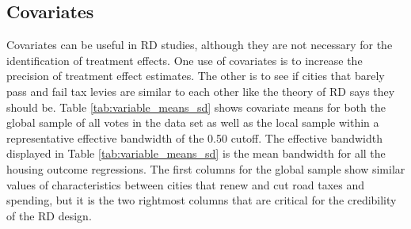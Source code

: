 

\subsection{Covariates} 

Covariates can be useful in RD studies, although they are not necessary for the identification of treatment effects.  One use of covariates is to increase the precision of treatment effect estimates.  The other is to see if cities that barely pass and fail tax levies are similar to each other like the theory of RD says they should be. Table \ref{tab:variable_means_sd} shows covariate means for both the global sample of all votes in the data set as well as the local sample within a representative effective bandwidth of the 0.50 cutoff. The effective bandwidth displayed in Table \ref{tab:variable_means_sd} is the mean bandwidth for all the housing outcome regressions. The first columns for the global sample show similar values of characteristics between cities that renew and cut road taxes and spending, but it is the two rightmost columns that are critical for the credibility of the RD design.   

